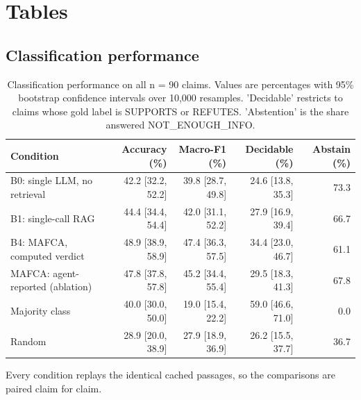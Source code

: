 \documentclass[11pt,a4paper]{article}
\begin{document}
\section{Tables}
\subsection{Classification performance}
\begin{table}[H]
\centering
\small
\caption{Classification performance on all n = 90 claims. Values are percentages with 95\% bootstrap confidence intervals over 10,000 resamples. 'Decidable' restricts to claims whose gold label is SUPPORTS or REFUTES. 'Abstention' is the share answered NOT\_ENOUGH\_INFO.}
\label{tab:classification}
\begin{tabular}{@{}lrrrr@{}}
\toprule
\textbf{Condition} & \textbf{Accuracy (\%)} & \textbf{Macro-F1 (\%)} & \textbf{Decidable (\%)} & \textbf{Abstain (\%)} \\
\midrule
B0: single LLM, no retrieval & 42.2 [32.2, 52.2] & 39.8 [28.7, 49.8] & 24.6 [13.8, 35.3] & 73.3 \\
B1: single-call RAG & 44.4 [34.4, 54.4] & 42.0 [31.1, 52.2] & 27.9 [16.9, 39.4] & 66.7 \\
B4: MAFCA, computed verdict & 48.9 [38.9, 58.9] & 47.4 [36.3, 57.5] & 34.4 [23.0, 46.7] & 61.1 \\
MAFCA: agent-reported (ablation) & 47.8 [37.8, 57.8] & 45.2 [34.4, 55.4] & 29.5 [18.3, 41.3] & 67.8 \\
Majority class & 40.0 [30.0, 50.0] & 19.0 [15.4, 22.2] & 59.0 [46.6, 71.0] & 0.0 \\
Random & 28.9 [20.0, 38.9] & 27.9 [18.9, 36.9] & 26.2 [15.5, 37.7] & 36.7 \\
\bottomrule
\end{tabular}
\par\vspace{2pt}\footnotesize{Every condition replays the identical cached passages, so the comparisons are paired claim for claim.}
\end{table}
\end{document}
